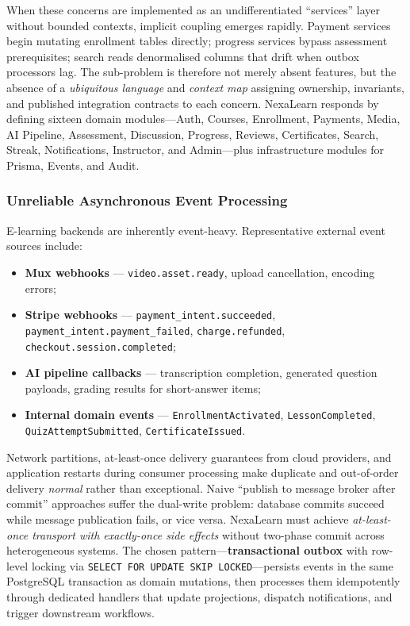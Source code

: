 When these concerns are implemented as an undifferentiated ``services'' layer without bounded contexts, implicit coupling emerges rapidly. Payment services begin mutating enrollment tables directly; progress services bypass assessment prerequisites; search reads denormalised columns that drift when outbox processors lag. The sub-problem is therefore not merely absent features, but the absence of a \textit{ubiquitous language} and \textit{context map} assigning ownership, invariants, and published integration contracts to each concern. NexaLearn responds by defining sixteen domain modules---Auth, Courses, Enrollment, Payments, Media, AI Pipeline, Assessment, Discussion, Progress, Reviews, Certificates, Search, Streak, Notifications, Instructor, and Admin---plus infrastructure modules for Prisma, Events, and Audit.

\subsubsection{Unreliable Asynchronous Event Processing}
\label{subsubsec:async-events}

E-learning backends are inherently event-heavy. Representative external event sources include:
\begin{itemize}
  \item \textbf{Mux webhooks} --- \texttt{video.asset.ready}, upload cancellation, encoding errors;
  \item \textbf{Stripe webhooks} --- \texttt{payment\_intent.succeeded}, \texttt{payment\_intent.payment\_failed}, \texttt{charge.refunded}, \texttt{checkout.session.completed};
  \item \textbf{AI pipeline callbacks} --- transcription completion, generated question payloads, grading results for short-answer items;
  \item \textbf{Internal domain events} --- \texttt{EnrollmentActivated}, \texttt{LessonCompleted}, \texttt{QuizAttemptSubmitted}, \texttt{CertificateIssued}.
\end{itemize}

Network partitions, at-least-once delivery guarantees from cloud providers, and application restarts during consumer processing make duplicate and out-of-order delivery \textit{normal} rather than exceptional. Naive ``publish to message broker after commit'' approaches suffer the dual-write problem: database commits succeed while message publication fails, or vice versa. NexaLearn must achieve \textit{at-least-once transport with exactly-once side effects} without two-phase commit across heterogeneous systems. The chosen pattern---\textbf{transactional outbox} with row-level locking via \texttt{SELECT FOR UPDATE SKIP LOCKED}---persists events in the same PostgreSQL transaction as domain mutations, then processes them idempotently through dedicated handlers that update projections, dispatch notifications, and trigger downstream workflows.

